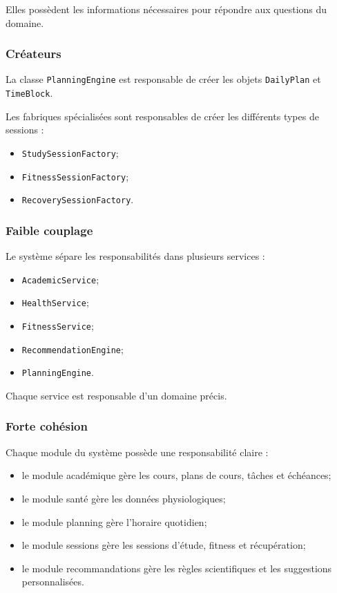 \documentclass[12pt]{article}
\begin{document}
Elles possèdent les informations nécessaires pour répondre aux questions du domaine.

\subsubsection{Créateurs}

La classe \texttt{PlanningEngine} est responsable de créer les objets \texttt{DailyPlan} et \texttt{TimeBlock}.

Les fabriques spécialisées sont responsables de créer les différents types de sessions :

\begin{itemize}
    \item \texttt{StudySessionFactory};
    \item \texttt{FitnessSessionFactory};
    \item \texttt{RecoverySessionFactory}.
\end{itemize}

\subsubsection{Faible couplage}

Le système sépare les responsabilités dans plusieurs services :

\begin{itemize}
    \item \texttt{AcademicService};
    \item \texttt{HealthService};
    \item \texttt{FitnessService};
    \item \texttt{RecommendationEngine};
    \item \texttt{PlanningEngine}.
\end{itemize}

Chaque service est responsable d'un domaine précis.

\subsubsection{Forte cohésion}

Chaque module du système possède une responsabilité claire :

\begin{itemize}
    \item le module académique gère les cours, plans de cours, tâches et échéances;
    \item le module santé gère les données physiologiques;
    \item le module planning gère l'horaire quotidien;
    \item le module sessions gère les sessions d'étude, fitness et récupération;
    \item le module recommandations gère les règles scientifiques et les suggestions personnalisées.
\end{itemize}
\end{document}
